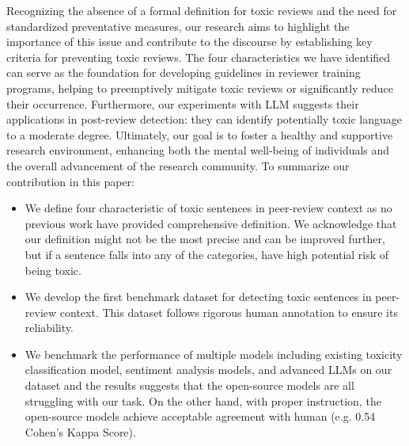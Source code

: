 Recognizing the absence of a formal definition for toxic reviews and the need for standardized preventative measures, our research aims to highlight the importance of this issue and contribute to the discourse by establishing key criteria for preventing toxic reviews. The four characteristics we have identified can serve as the foundation for developing guidelines in reviewer training programs, helping to preemptively mitigate toxic reviews or significantly reduce their occurrence. Furthermore, our experiments with LLM suggests their applications in post-review detection: they can identify potentially toxic language to a moderate degree. Ultimately, our goal is to foster a healthy and supportive research environment, enhancing both the mental well-being of individuals and the overall advancement of the research community.
To summarize our contribution in this paper: 
\begin{itemize}
\item We define four characteristic of toxic sentences in peer-review context as no previous work have provided comprehensive definition. We acknowledge that our definition might not be the most precise and can be improved further, but if a sentence falls into any of the categories, have high potential risk of being toxic. 
\item We develop the first benchmark dataset for detecting toxic sentences in peer-review context. This dataset follows rigorous human annotation to ensure its reliability.
\item We benchmark the performance of multiple models including existing toxicity classification model, sentiment analysis models, and advanced LLMs on our dataset and the results suggests that the open-source models are all struggling with our task. On the other hand, with proper instruction, the open-source models achieve acceptable agreement with human (e.g. 0.54 Cohen's Kappa Score). 
\end{itemize}